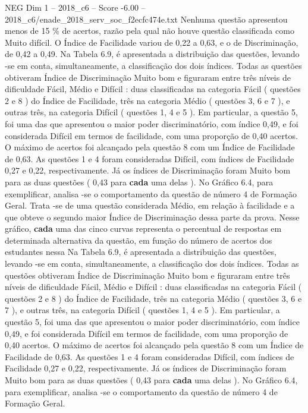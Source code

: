 \begin{textsample}{NEG Dim 1 – 2018\_c6 – Score -6.00 – 2018\_c6/enade\_2018\_serv\_soc\_f2ecfc474e.txt}
Nenhuma questão apresentou menos de 15 \% de acertos, razão pela qual não houve questão classificada como Muito difícil.
O Índice de Facilidade variou de 0,22 a 0,63, e o de Discriminação, de 0,42 a 0,49.
Na Tabela 6.9, é apresentada a distribuição das questões, levando -se em conta, simultaneamente, a classificação dos dois índices.
Todas as questões obtiveram Índice de Discriminação Muito bom e figuraram entre três níveis de dificuldade Fácil, Médio e Difícil : duas classificadas na categoria Fácil ( questões 2 e 8 ) do Índice de Facilidade, três na categoria Médio ( questões 3, 6 e 7 ), e outras três, na categoria Difícil ( questões 1, 4 e 5 ).
Em particular, a questão 5, foi uma das que apresentou o maior poder discriminatório, com índice 0,49, e foi considerada Difícil em termos de facilidade, com uma proporção de 0,40 acertos.
O máximo de acertos foi alcançado pela questão 8 com um Índice de Facilidade de 0,63.
As questões 1 e 4 foram consideradas Difícil, com índices de Facilidade 0,27 e 0,22, respectivamente.
Já os índices de Discriminação foram Muito bom para as duas questões ( 0,43 para \textbf{cada} uma delas ).
No Gráfico 6.4, para exemplificar, analisa -se o comportamento da questão de número 4 de Formação Geral.
Trata -se de uma questão considerada Médio, em relação à facilidade e a que obteve o segundo maior Índice de Discriminação dessa parte da prova.
Nesse gráfico, \textbf{cada} uma das cinco curvas representa o percentual de respostas em determinada alternativa da questão, em função do número de acertos dos estudantes nessa Na Tabela 6.9, é apresentada a distribuição das questões, levando -se em conta, simultaneamente, a classificação dos dois índices.
Todas as questões obtiveram Índice de Discriminação Muito bom e figuraram entre três níveis de dificuldade Fácil, Médio e Difícil : duas classificadas na categoria Fácil ( questões 2 e 8 ) do Índice de Facilidade, três na categoria Médio ( questões 3, 6 e 7 ), e outras três, na categoria Difícil ( questões 1, 4 e 5 ).
Em particular, a questão 5, foi uma das que apresentou o maior poder discriminatório, com índice 0,49, e foi considerada Difícil em termos de facilidade, com uma proporção de 0,40 acertos.
O máximo de acertos foi alcançado pela questão 8 com um Índice de Facilidade de 0,63.
As questões 1 e 4 foram consideradas Difícil, com índices de Facilidade 0,27 e 0,22, respectivamente.
Já os índices de Discriminação foram Muito bom para as duas questões ( 0,43 para \textbf{cada} uma delas ).
No Gráfico 6.4, para exemplificar, analisa -se o comportamento da questão de número 4 de Formação Geral.

\end{textsample}

